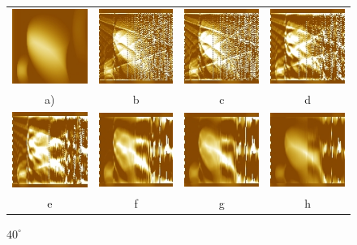 \documentclass{procDDs}
\begin{document}
\begin{figure}[h!]\center
	\begin{tabular}{cccc}
		\includegraphics[width=0.2\linewidth]{img/17/1.jpg}
		&
		\includegraphics[width=0.2\linewidth]{img/17/3.jpg}
		&
		\includegraphics[width=0.2\linewidth]{img/17/4.jpg}
		&
		\includegraphics[width=0.2\linewidth]{img/17/5.jpg}
		\\
		a) & b & c & d
		\\
		\includegraphics[width=0.2\linewidth]{img/17/6.jpg}
		&
		\includegraphics[width=0.2\linewidth]{img/17/7.jpg}
		&
		\includegraphics[width=0.2\linewidth]{img/17/8.jpg}
		&
		\includegraphics[width=0.2\linewidth]{img/17/9.jpg}
		\\
		e & f & g & h
	\end{tabular}
	\caption{$40^\circ$}
	\label{ris:desc6}
\end{figure}
\end{document}
